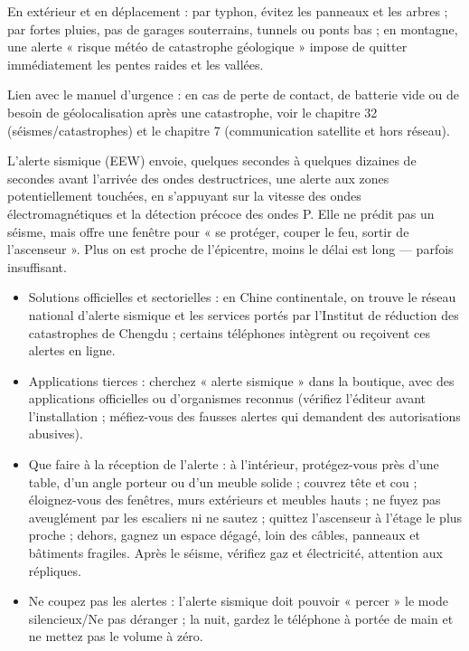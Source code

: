En extérieur et en déplacement : par typhon, évitez les panneaux et les arbres ; par fortes pluies, pas de garages souterrains, tunnels ou ponts bas ; en montagne, une alerte « risque météo de catastrophe géologique » impose de quitter immédiatement les pentes raides et les vallées.

Lien avec le manuel d'urgence : en cas de perte de contact, de batterie vide ou de besoin de géolocalisation après une catastrophe, voir le chapitre 32 (séismes/catastrophes) et le chapitre 7 (communication satellite et hors réseau).


L'alerte sismique (EEW) envoie, quelques secondes à quelques dizaines de secondes avant l'arrivée des ondes destructrices, une alerte aux zones potentiellement touchées, en s'appuyant sur la vitesse des ondes électromagnétiques et la détection précoce des ondes P. Elle ne prédit pas un séisme, mais offre une fenêtre pour « se protéger, couper le feu, sortir de l'ascenseur ». Plus on est proche de l'épicentre, moins le délai est long — parfois insuffisant.

\begin{itemize}
  \item Solutions officielles et sectorielles : en Chine continentale, on trouve le réseau national d'alerte sismique et les services portés par l'Institut de réduction des catastrophes de Chengdu ; certains téléphones intègrent ou reçoivent ces alertes en ligne.
  \item Applications tierces : cherchez « alerte sismique » dans la boutique, avec des applications officielles ou d'organismes reconnus (vérifiez l'éditeur avant l'installation ; méfiez-vous des fausses alertes qui demandent des autorisations abusives).
  \item Que faire à la réception de l'alerte : à l'intérieur, protégez-vous près d'une table, d'un angle porteur ou d'un meuble solide ; couvrez tête et cou ; éloignez-vous des fenêtres, murs extérieurs et meubles hauts ; ne fuyez pas aveuglément par les escaliers ni ne sautez ; quittez l'ascenseur à l'étage le plus proche ; dehors, gagnez un espace dégagé, loin des câbles, panneaux et bâtiments fragiles. Après le séisme, vérifiez gaz et électricité, attention aux répliques.
  \item Ne coupez pas les alertes : l'alerte sismique doit pouvoir « percer » le mode silencieux/Ne pas déranger ; la nuit, gardez le téléphone à portée de main et ne mettez pas le volume à zéro.
\end{itemize}

